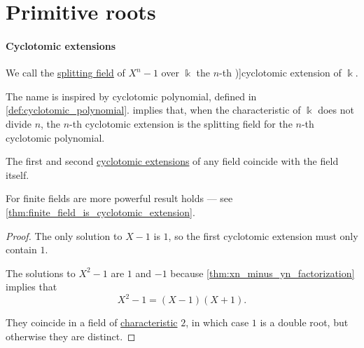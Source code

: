 \section{Primitive roots}\label{sec:primitive_roots}

\paragraph{Cyclotomic extensions}

\begin{definition}\label{def:cyclotomic_extension}
  We call the \hyperref[def:splitting_field]{splitting field} of \( X^n - 1 \) over \( \Bbbk \) the \( n \)-th \term[ru=круговое / циклотомическое (поле разложения) (\cite[204]{Кострикин2020АлгебраЧасть3})]{cyclotomic extension} of \( \Bbbk \).
\end{definition}
\begin{comments}
  \item The name is inspired by cyclotomic polynomial, defined in \cref{def:cyclotomic_polynomial}.  implies that, when the characteristic of \( \Bbbk \) does not divide \( n \), the \( n \)-th cyclotomic extension is the splitting field for the \( n \)-th cyclotomic polynomial.
\end{comments}

\begin{proposition}\label{thm:small_cyclotomic_extensions}
  The first and second \hyperref[def:cyclotomic_extension]{cyclotomic extensions} of any field coincide with the field itself.
\end{proposition}
\begin{comments}
  \item For finite fields are more powerful result holds --- see \cref{thm:finite_field_is_cyclotomic_extension}.
\end{comments}
\begin{proof}
  The only solution to \( X - 1 \) is \( 1 \), so the first cyclotomic extension must only contain \( 1 \).

  The solutions to \( X^2 - 1 \) are \( 1 \) and \( -1 \) because \cref{thm:xn_minus_yn_factorization} implies that
  \begin{equation*}
    X^2 - 1 = (X - 1)(X + 1).
  \end{equation*}

  They coincide in a field of \hyperref[def:ring_characteristic]{characteristic} \( 2 \), in which case \( 1 \) is a double root, but otherwise they are distinct.
\end{proof}

